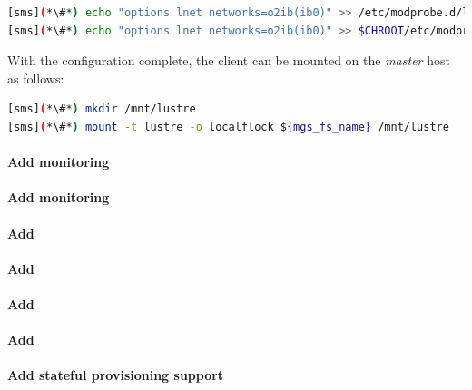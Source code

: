 \documentclass[letterpaper]{article}
\begin{document}
\begin{lstlisting}[language=bash,keywords={},upquote=true]
[sms](*\#*) echo "options lnet networks=o2ib(ib0)" >> /etc/modprobe.d/lustre.conf
[sms](*\#*) echo "options lnet networks=o2ib(ib0)" >> $CHROOT/etc/modprobe.d/lustre.conf
\end{lstlisting}

With the \Lustre{} configuration complete, the client can be mounted on the {\em master}
host as follows:
\begin{lstlisting}[language=bash,keywords={},upquote=true]
[sms](*\#*) mkdir /mnt/lustre
[sms](*\#*) mount -t lustre -o localflock ${mgs_fs_name} /mnt/lustre
\end{lstlisting}


\paragraph{Add \Nagios{} monitoring}


\clearpage
\paragraph{Add \Ganglia{} monitoring}


\paragraph{Add \clustershell{}}


\paragraph{Add \mrsh{}}


\paragraph{Add \genders{}}


\paragraph{Add \powerman{}}


\paragraph{Add stateful provisioning support}

\end{document}
